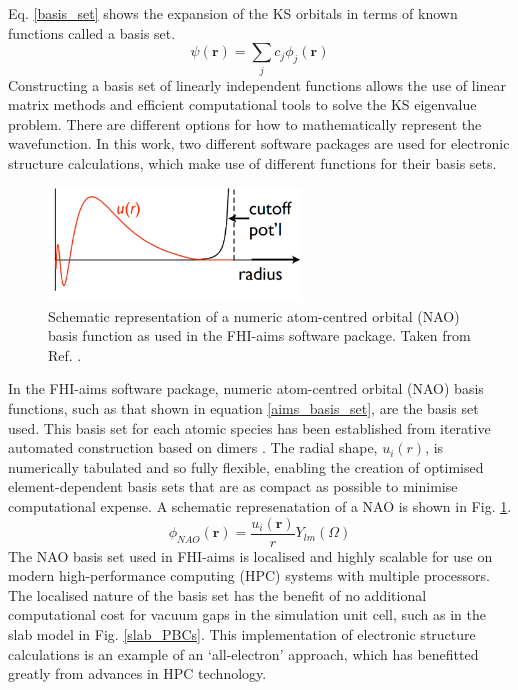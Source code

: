 \documentclass[11pt, twoside]{report}
\begin{document}
Eq. \ref{basis_set} shows the expansion of the KS orbitals in terms of known functions called a basis set. 
\begin{equation}\label{basis_set}
\psi(\mathbf{r}) = \sum_j c_j \phi_j(\mathbf{r})
\end{equation}
Constructing a basis set of linearly independent functions allows the use of linear matrix methods and efficient computational tools to solve the KS eigenvalue problem. There are different options for how to mathematically represent the wavefunction. In this work, two different software packages are used for electronic structure calculations, which make use of different functions for their basis sets. 

\begin{figure}[h!]
  \centering
    \includegraphics[width=0.6\textwidth]{figures/aims_NACBF.png}
    \caption{Schematic representation of a numeric atom-centred orbital (NAO) basis function as used in the FHI-aims software package. Taken from Ref. .}
  \label{aims_NACBF}
\end{figure}

In the FHI-aims software package, numeric atom-centred orbital (NAO) basis functions, such as that shown in equation \ref{aims_basis_set}, are the basis set used. This basis set for each atomic species has been established from iterative automated construction based on dimers \cite{FHI-aims_slides}. The radial shape, $u_i(r)$, is numerically tabulated and so fully flexible, enabling the creation of optimised element-dependent basis sets that are as compact as possible to minimise computational expense. A schematic represenatation of a NAO is shown in Fig. \ref{aims_NACBF}.
\begin{equation}\label{aims_basis_set}
\phi_{NAO}(\mathbf{r}) = \frac{u_i(\mathbf{r})}{r} Y_{lm}(\Omega)
\end{equation}
The NAO basis set used in FHI-aims is localised and highly scalable for use on modern high-performance computing (HPC) systems with multiple processors. The localised nature of the basis set has the benefit of no additional computational cost for vacuum gaps in the simulation unit cell, such as in the slab model in Fig. \ref{slab_PBCs}. This implementation of electronic structure calculations is an example of an `all-electron' approach, which has benefitted greatly from advances in HPC technology. 
\end{document}
